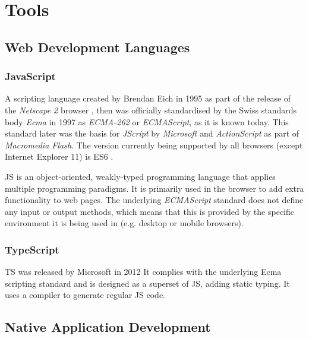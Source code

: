 \chapter{Tools}
\label{chapter:tools}


\section{Web Development Languages}



\subsection{JavaScript}

A scripting language created by Brendan Eich in 1995 as part of the release of the \emph{Netscape 2} browser \parencite{javascriptRelease}, then was officially standardised by the Swiss standards body \emph{Ecma} in 1997 as \emph{ECMA-262} or \emph{ECMAScript}, as it is known today. This standard later was the basis for \emph{JScript} by \emph{Microsoft} and \emph{ActionScript} as part of \emph{Macromedia Flash}. The version currently being supported by all browsers (except Internet Explorer 11) is \ac{ES6} \parencite{javascriptHistory}.

\ac{JS} is an object-oriented, weakly-typed programming language that applies multiple programming paradigms. It is primarily used in the browser to add extra functionality to web pages. The underlying \emph{ECMAScript} standard does not define any input or output methods, which means that this is provided by the specific environment it is being used in (e.g. desktop or mobile browsers).

\subsection{TypeScript}

\ac{TS} was released by Microsoft in 2012  It complies with the underlying Ecma scripting standard and is designed as a superset of \ac{JS}, adding static typing. It uses a compiler to generate regular \ac{JS} code.


\section{Native Application Development}

